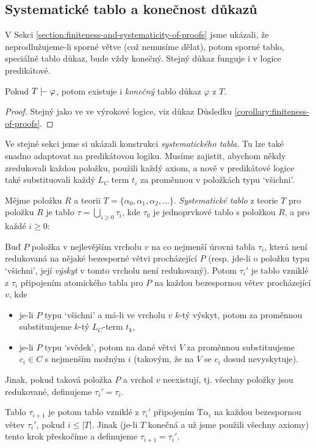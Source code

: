 \subsection{Systematické tablo a konečnost důkazů}

V Sekci \ref{section:finiteness-and-systematicity-of-proofs} jsme ukázali, že neprodlužujeme-li sporné větve (což nemusíme dělat), potom sporné tablo, speciálně tablo důkaz, bude vždy konečný. Stejný důkaz funguje i v logice predikátové.

\begin{corollary}\label{corollary:finiteness-of-proofs-predicate}
    Pokud $T\proves\varphi$, potom existuje i \emph{konečný} tablo důkaz $\varphi$ z $T$.
\end{corollary}
\begin{proof}
Stejný jako ve ve výrokové logice, viz důkaz Důsledku \ref{corollary:finiteness-of-proofs}.
\end{proof}

Ve stejné sekci jsme si ukázali konstrukci \emph{systematického tabla}. Tu lze také snadno adaptovat na predikátovou logiku. Musíme zajistit, abychom někdy zredukovali každou položku, použili každý axiom, a nově v predikátové logice také substituovali každý $L_C$ term $t_i$ za proměnnou v položkách typu `všichni'.

\begin{definition}
Mějme položku $R$ a teorii $T=\{\alpha_0,\alpha_1,\alpha_2,\dots\}$. \emph{Systematické tablo} z teorie $T$ pro položku $R$ je tablo $\tau=\bigcup_{i\geq 0}\tau_i$, kde $\tau_0$ je jednoprvkové tablo s položkou $R$, a pro každé $i\geq 0$:

Buď $P$ položka v nejlevějším vrcholu $v$ na co nejmenší úrovni tabla $\tau_i$, která není redukovaná na nějaké bezesporné větvi procházející $P$ (resp. jde-li o položku typu `všichni', její \emph{výskyt} v tomto vrcholu není redukovaný). Potom $\tau_i'$ je tablo vzniklé z $\tau_i$ připojením atomického tabla pro $P$ na každou bezespornou větev procházející $v$, kde
\begin{itemize}
    \item je-li $P$ typu `všichni' a má-li ve vrcholu $v$ $k$-tý výskyt, potom za proměnnou substituujeme $k$-tý $L_C$-term $t_k$,
    \item je-li $P$ typu `svědek', potom na dané větvi $V$ za proměnnou substituujeme $c_i\in C$ s nejmenším možným $i$ (takovým, že na $V$ se $c_i$ dosud nevyskytuje).
\end{itemize}
Jinak, pokud taková položka $P$ a vrchol $v$ neexistují, tj. všechny položky jsou redukované, definujeme $\tau_i'=\tau_i$.

Tablo $\tau_{i+1}$ je potom tablo vzniklé z $\tau_i'$ připojením $\mathrm{T}\alpha_i$ na každou bezespornou větev $\tau_i'$, pokud $i\leq |T|$. Jinak (je-li $T$ konečná a už jsme použili všechny axiomy) tento krok přeskočíme a definujeme $\tau_{i+1}=\tau_i'$. 
\end{definition}


